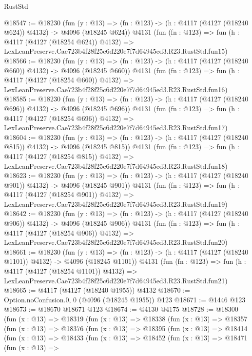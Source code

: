 \begin{lexlean}{RustStd}
\begin{coremodule}
@18547 := @18230
    (fun (y : @13) => (fn : @123) -> (h : @4117 (@4127 (@18240 @624)) @4132) -> @4096 (@18245 @624))
    @4131
    (fun (fn : @123) =>
    fun (h : @4117 (@4127 (@18254 @624)) @4132) =>
    LexLeanPreserve.Cae723b4f28f25c6d220e7f7d64945ed3.R23.RustStd.fun15)
@18566 := @18230
    (fun (y : @13) => (fn : @123) -> (h : @4117 (@4127 (@18240 @660)) @4132) -> @4096 (@18245 @660))
    @4131
    (fun (fn : @123) =>
    fun (h : @4117 (@4127 (@18254 @660)) @4132) =>
    LexLeanPreserve.Cae723b4f28f25c6d220e7f7d64945ed3.R23.RustStd.fun16)
@18585 := @18230
    (fun (y : @13) => (fn : @123) -> (h : @4117 (@4127 (@18240 @696)) @4132) -> @4096 (@18245 @696))
    @4131
    (fun (fn : @123) =>
    fun (h : @4117 (@4127 (@18254 @696)) @4132) =>
    LexLeanPreserve.Cae723b4f28f25c6d220e7f7d64945ed3.R23.RustStd.fun17)
@18604 := @18230
    (fun (y : @13) => (fn : @123) -> (h : @4117 (@4127 (@18240 @815)) @4132) -> @4096 (@18245 @815))
    @4131
    (fun (fn : @123) =>
    fun (h : @4117 (@4127 (@18254 @815)) @4132) =>
    LexLeanPreserve.Cae723b4f28f25c6d220e7f7d64945ed3.R23.RustStd.fun18)
@18623 := @18230
    (fun (y : @13) => (fn : @123) -> (h : @4117 (@4127 (@18240 @901)) @4132) -> @4096 (@18245 @901))
    @4131
    (fun (fn : @123) =>
    fun (h : @4117 (@4127 (@18254 @901)) @4132) =>
    LexLeanPreserve.Cae723b4f28f25c6d220e7f7d64945ed3.R23.RustStd.fun19)
@18642 := @18230
    (fun (y : @13) => (fn : @123) -> (h : @4117 (@4127 (@18240 @906)) @4132) -> @4096 (@18245 @906))
    @4131
    (fun (fn : @123) =>
    fun (h : @4117 (@4127 (@18254 @906)) @4132) =>
    LexLeanPreserve.Cae723b4f28f25c6d220e7f7d64945ed3.R23.RustStd.fun20)
@18661 := @18230
    (fun (y : @13) =>
    (fn : @123) -> (h : @4117 (@4127 (@18240 @1101)) @4132) -> @4096 (@18245 @1101))
    @4131
    (fun (fn : @123) =>
    fun (h : @4117 (@4127 (@18254 @1101)) @4132) =>
    LexLeanPreserve.Cae723b4f28f25c6d220e7f7d64945ed3.R23.RustStd.fun21)
@18665 := @4117 (@4127 (@18240 @1955)) @4132
@18670 := Option.noConfusion.{0, 0} (@4096 (@18245 @1955)) @123
@18671 := @1446 @123
@18673 := @18670 @18671 @123
@18674 := @4130 @4175
@18728 := @18300
    (fun (x : @13) =>
    @18319
      (fun (x : @13) =>
      @18338
        (fun (x : @13) =>
        @18357
          (fun (x : @13) =>
          @18376
            (fun (x : @13) =>
            @18395
              (fun (x : @13) =>
              @18414
                (fun (x : @13) =>
                @18433
                  (fun (x : @13) =>
                  @18452
                    (fun (x : @13) =>
                    @18471
                      (fun (x : @13) =>

\end{coremodule}
\end{lexlean}
